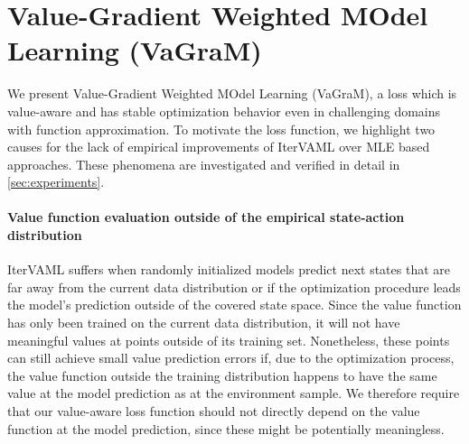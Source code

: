 \section{Value-Gradient Weighted MOdel Learning (VaGraM)}
\label{sec:method}

We present Value-Gradient Weighted MOdel Learning (VaGraM), a loss which is value-aware and has stable optimization behavior even in challenging domains with function approximation.
To motivate the loss function, we highlight two causes for the lack of empirical improvements of IterVAML over MLE based approaches.
These phenomena are investigated and verified in detail in \autoref{sec:experiments}.

\paragraph{Value function evaluation outside of the empirical state-action distribution} IterVAML suffers when randomly initialized models predict next states that are far away from the current data distribution or if the optimization procedure leads the model's prediction outside of the covered state space. 
Since the value function has only been trained on the current data distribution, it will not have meaningful values at points outside of its training set.
Nonetheless, these points can still achieve small value prediction errors if, due to the optimization process, the value function outside the training distribution happens to have the same value at the model prediction as at the environment sample.
We therefore require that our value-aware loss function should not directly depend on the value function at the model prediction, since these might be potentially meaningless.


